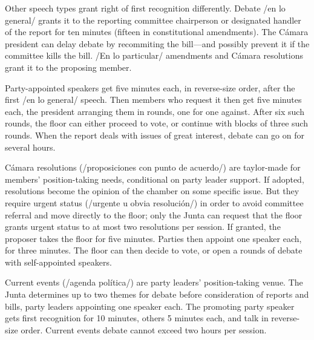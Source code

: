 \documentclass[letter,12pt]{article}
\begin{document}
Other speech types grant right of first recognition differently. Debate /en lo general/ grants it to the reporting committee chairperson or designated handler of the report for ten minutes (fifteen in constitutional amendments). The Cámara president can delay debate by recommiting the bill---and possibly prevent it if the committee kills the bill. /En lo particular/ amendments and Cámara resolutions grant it to the proposing member. 

Party-appointed speakers get five minutes each, in reverse-size order, after the first /en lo general/ speech. Then members who request it then get five minutes each, the president arranging them in rounds, one for one against. After six such rounds, the floor can either proceed to vote, or continue with blocks of three such rounds. When the report deals with issues of great interest, debate can go on for several hours.




Cámara resolutions (/proposiciones con punto de acuerdo/) are taylor-made for members' position-taking needs, conditional on party leader support. If adopted, resolutions become the opinion of the chamber on some specific issue. But they require urgent status (/urgente u obvia resolución/) in order to avoid committee referral and move directly to the floor; only the Junta can request that the floor grants urgent status to at most two resolutions per session. If granted, the proposer takes the floor for five minutes. Parties then appoint one speaker each, for three minutes. The floor can then decide to vote, or open a rounds of debate with self-appointed speakers.

Current events (/agenda política/) are party leaders' position-taking venue. The Junta determines up to two themes for debate before consideration of reports and bills, party leaders appointing one speaker each. The promoting party speaker gets first recognition for 10 minutes, others 5 minutes each, and talk in reverse-size order. Current events debate cannot exceed two hours per session. 
\end{document}
